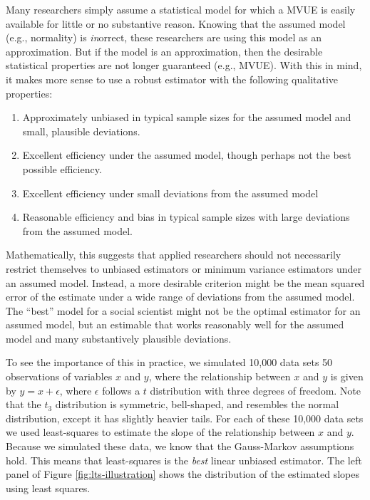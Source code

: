 \documentclass[12pt]{article}
\begin{document}
Many researchers simply assume a statistical model for which a MVUE is easily available for little or no substantive reason. Knowing that the assumed model (e.g., normality) is \textit{in}orrect, these researchers are using this model as an approximation. But if the model is an approximation, then the desirable statistical properties are not longer guaranteed (e.g., MVUE). With this in mind, it makes more sense to use a robust estimator with the following qualitative properties:
\begin{enumerate}
\item Approximately unbiased in typical sample sizes for the assumed model and small, plausible deviations.
\item Excellent efficiency under the assumed model, though perhaps not the best possible efficiency.
\item Excellent efficiency under small deviations from the assumed model
\item Reasonable efficiency and bias in typical sample sizes with large deviations from the assumed model. 
\end{enumerate}

Mathematically, this suggests that applied researchers should not necessarily restrict themselves to unbiased estimators or minimum variance estimators under an assumed model. Instead, a more desirable criterion might be the mean squared error of the estimate under a wide range of deviations from the assumed model. The ``best'' model for a social scientist might not be the optimal estimator for an assumed model, but an estimable that works reasonably well for the assumed model and many substantively plausible deviations. 

To see the importance of this in practice, we simulated 10,000 data sets 50 observations of variables $x$ and $y$, where the relationship between $x$ and $y$ is given by $y = x + \epsilon$, where $\epsilon$ follows a $t$ distribution with three degrees of freedom. Note that the $t_3$ distribution is symmetric, bell-shaped, and resembles the normal distribution, except it has slightly heavier tails. For each of these 10,000 data sets we used least-squares to estimate the slope of the relationship between $x$ and $y$. Because we simulated these data, we know that the Gauss-Markov assumptions hold. This means that least-squares is the \textit{best} linear unbiased estimator. The left panel of Figure \ref{fig:lts-illustration} shows the distribution of the estimated slopes using least squares.
\end{document}
